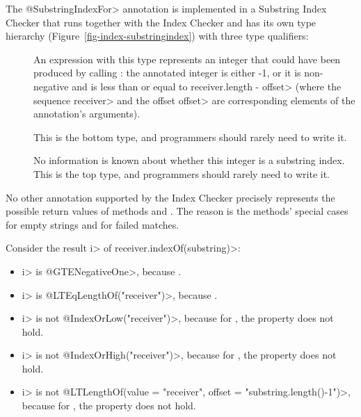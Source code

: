 The \<@SubstringIndexFor> annotation is implemented in a Substring Index
Checker that runs together with the Index Checker and has its own type
hierarchy (Figure~\ref{fig-index-substringindex}) with three type
qualifiers:
\begin{description}
\item[]
  An expression with this type represents an integer that could have been
  produced by calling
  :
  the annotated integer is either -1, or it is non-negative and is less
  than or equal to \<receiver.length - offset> (where the sequence
  \<receiver> and the offset \<offset> are corresponding elements of the
  annotation's arguments).
\item[]
  This is the bottom type, and programmers should rarely need to write it.
\item[]
  No information is known about whether this integer is a substring index.
  This is the top type, and programmers should rarely need to write it.
\end{description}



No other annotation supported by the Index Checker precisely represents the
possible return values of methods
and
.
The reason is the methods' special cases for empty strings and for failed matches.

Consider the result \<i> of \<receiver.indexOf(substring)>:

\begin{itemize}
\item
  \<i> is \<@GTENegativeOne>, because .
\item
  \<i> is \<@LTEqLengthOf("receiver")>, because .
\item
  \<i> is not \<@IndexOrLow("receiver")>, because for
  , the property
   does not hold.
\item
  \<i> is not \<@IndexOrHigh("receiver")>, because for
  , the property
   does not hold.
\item
  \<i> is not
  \<@LTLengthOf(value = "receiver", offset = "substring.length()-1")>,
  because for , the property
   does not hold.
\end{itemize}

